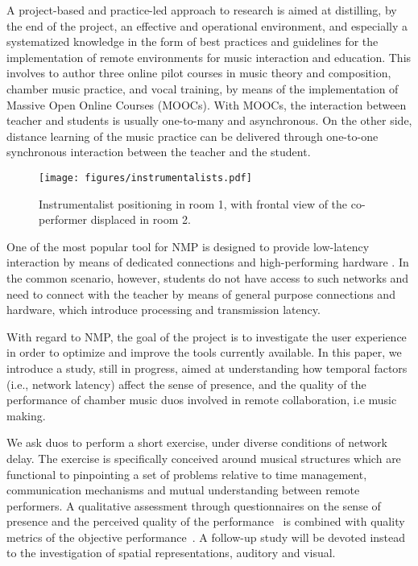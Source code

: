A project-based and practice-led approach to research %
is aimed at distilling, by the end of the project, an effective and operational environment, and especially a systematized knowledge in the form of best practices and guidelines for the implementation of remote environments for music interaction and education. This involves to author three online pilot courses in music theory and composition, chamber music practice, and vocal training, by means of the implementation of Massive Open Online Courses (MOOCs). With MOOCs, the interaction between teacher and students is usually one-to-many and asynchronous. On the other side, distance learning of the music practice can be delivered through one-to-one synchronous interaction between the teacher and the student. 
\begin{figure*}[!t]
	\centerline{
		\texttt{[image: figures/instrumentalists.pdf]}}
	\caption{Instrumentalist positioning in room 1, with frontal view of the co-performer displaced in room 2.} 
	\label{fig:instrumentalists}
\end{figure*}

One of the most popular tool for NMP is designed to provide low-latency interaction by means of dedicated connections and high-performing hardware \cite{drioli2013networked}. In the common scenario, however, students do not have access to such networks and need to connect with the teacher by means of general purpose connections and hardware, which introduce processing and transmission latency.  

With regard to NMP, the goal of the project is to investigate the user experience in order to optimize and improve the tools currently available. In this paper, we introduce a study, still in progress, aimed at understanding how temporal factors (i.e., network latency) affect the sense of presence, and the quality of the performance of chamber music duos involved in remote collaboration, i.e music making. 

We ask duos to perform a short exercise, under diverse conditions of network delay. 
The exercise is specifically conceived around musical structures which are functional to pinpointing a set of problems relative to time management, communication mechanisms and mutual understanding between remote performers. A qualitative assessment through questionnaires on the sense of presence and the perceived quality of the performance~\cite{schubert2001experience} is combined with quality metrics of the objective performance~\cite{rottondi2015feature}.
A follow-up study will be devoted instead to the investigation of spatial representations, auditory and visual.

